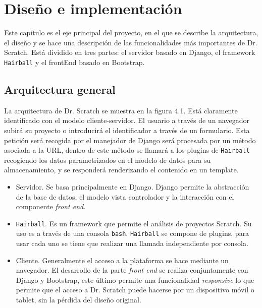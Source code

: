 \documentclass[a4paper, 12pt]{book}
\begin{document}

\cleardoublepage
\chapter{Diseño e implementación}

Este capítulo es el eje principal del proyecto, en el que se describe la arquitectura,
el diseño y se hace una descripción de las funcionalidades más importantes de Dr.
Scratch. Está dividido en tres partes: el servidor basado en Django, el framework
\texttt{Hairball} y el frontEnd basado en Bootstrap.

\section{Arquitectura general}
\label{sec:arquitectura}

La arquitectura de Dr. Scratch se muestra en la figura 4.1. Está claramente identificado
con el modelo cliente-servidor. El usuario a través de un navegador subirá su proyecto
o introducirá el identificador a través de un formulario. Esta petición será recogida 
por el manejador de Django será procesada por un método asociada a la URL, dentro de 
este método se llamará a los plugins de \texttt{Hairball} recogiendo los datos parametrizados en
el modelo de datos para su almacenamiento, y se responderá renderizando el contenido
en un template.

\begin{itemize}
  \item Servidor. Se basa principalmente en Django. Django permite la abstracción de la
	base de datos, el modelo vista controlador y la interacción con el componente \emph{front end}.
  \item \texttt{Hairball}. Es un framework que permite el análisis de proyectos Scratch. Su uso es
	a través de una consola \texttt{bash}. \texttt{Hairball} se compone de plugins, para usar cada uno se
	tiene que realizar una llamada independiente por consola.
  \item Cliente. Generalmente el acceso a la plataforma se hace mediante un navegador. El
	desarrollo de la parte \emph{front end} se realiza conjuntamente con Django y Bootstrap, este
	último permite una funcionalidad \emph{responsive} lo que permite que el acceso a Dr. Scratch
	puede hacerse por un dispositivo móvil o tablet, sin la pérdida del diseño original.
	
\end{itemize}
\end{document}
